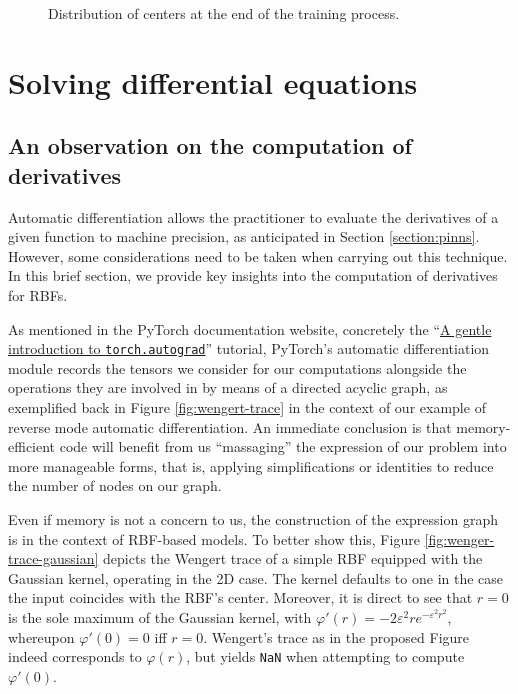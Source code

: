 \documentclass[12pt]{report} %
\begin{document}
\begin{figure}[h]
\begin{tabular}{cc}
  \end{tabular}
  \caption{Distribution of centers at the end of the training process.}
  \label{fig:parabola-results-centers}
\end{figure}


\clearpage
\section{Solving differential equations}

\subsection*{An observation on the computation of derivatives}

Automatic differentiation allows the
practitioner to evaluate the derivatives of a given function to machine precision, as anticipated in Section \ref{section:pinns}.
However, some considerations need to be taken when carrying out this technique. In this brief section, we provide key insights into the computation of derivatives for RBFs.

As mentioned in the PyTorch documentation website, concretely the
``\href{https://pytorch.org/tutorials/beginner/blitz/autograd_tutorial.html}{A gentle
  introduction to \texttt{torch.autograd}}'' tutorial, PyTorch's automatic differentiation
module records the tensors we consider for our computations alongside the operations
they are involved in by means of a directed acyclic graph, as exemplified back in
Figure \ref{fig:wengert-trace} in the context of our example of reverse
mode automatic differentiation. An immediate conclusion is that memory-efficient code will benefit from us
``massaging'' the expression of our problem into more manageable forms, that is, applying
simplifications or identities to reduce the number of nodes on our graph.


Even if memory is not a concern to us, the construction of the expression graph is in the context of RBF-based models. To better show this, Figure \ref{fig:wenger-trace-gaussian}
depicts the Wengert trace of a simple RBF equipped with the Gaussian kernel, operating in the 2D
case. The kernel defaults to one in the case the input coincides with the RBF's center. Moreover, it is direct to see that $r=0$ is the sole maximum of the Gaussian kernel, with $\varphi'(r)=-2 \varepsilon^2 r
  e^{-\varepsilon^2 r^2}$, whereupon $\varphi'(0)=0$ iff $r=0$. Wengert's trace as in the proposed Figure
indeed corresponds to $\varphi(r)$, but yields \texttt{NaN} when attempting to compute
$\varphi'(0)$.
\end{document}
